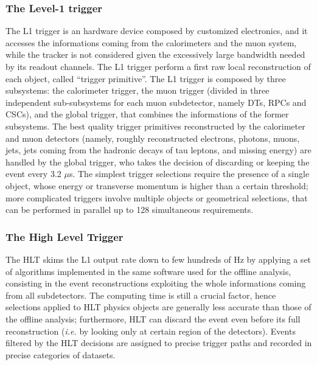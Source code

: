 \subsubsection{The Level-1 trigger}
The L1 trigger is an hardware device composed by customized electronics, and it accesses the informations coming from the calorimeters and the muon system, while the tracker is not considered given the excessively large bandwidth needed by its readout channels. The L1 trigger perform a first raw local reconstruction of each object, called ``trigger primitive''. The L1 trigger is composed by three subsystems: the calorimeter trigger, the muon trigger (divided in three independent sub-subsystems for each muon subdetector, namely DTs, RPCs and CSCs), and the global trigger, that combines the informations of the former subsystems. The best quality trigger primitives reconstructed by the calorimeter and muon detectors (namely, roughly reconstructed electrons, photons, muons, jets, jets coming from the hadronic decays of tau leptons, and missing energy) are handled by the global trigger, who takes the decision of discarding or keeping the event every 3.2 $\mu$s. The simplest trigger selections require the presence of a single object, whose energy or transverse momentum is higher than a certain threshold; more complicated triggers involve multiple objects or geometrical selections, that can be performed in parallel up to 128 simultaneous requirements.

\subsubsection{The High Level Trigger}
The HLT skims the L1 output rate down to few hundreds of Hz by applying a set of algorithms implemented in the same software used for the offline analysis, consisting in the event reconstructions exploiting the whole informations coming from all subdetectors. The computing time is still a crucial factor, hence selections applied to HLT physics objects are generally less accurate than those of the offline analysis; furthermore, HLT can discard the event even before its full reconstruction (\textit{i.e.} by looking only at certain region of the detectors). Events filtered by the HLT decisions are assigned to precise trigger paths and recorded in precise categories of datasets.

